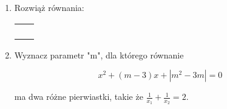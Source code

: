 \documentclass[12pt,a4paper]{article}
\begin{document}
	\begin{enumerate}[1.]
		
		\item Rozwiąż równania: %
		
		\begin{enumerate}[a)] \begin{tabular}{p{7cm} p{7cm}} 
				\item $||x+3|-4|=5$ & \vspace{0.4cm} 	\item$||x-1|-1|=|x-2|$ \\
				\item $\sqrt{x^2+4x+3}<\frac{25}{3}-\sqrt{x^2-6x+9}$ & \item $2x^2+x|2x-1|\leq3$ \\
				\item $(x-1)^2+|x-1|>6$ & \item $|x^2-3x|+x=2$ \\
				\item $x|x|+|2x-3|=4$ & \item $|x^2-|x|-2|>2$ \\
		\end{tabular} \end{enumerate}
		
		\item Wyznacz parametr "m", dla którego równanie 
		
		$$x^2+(m-3)x+|m^2-3m|=0$$
		
		ma dwa różne pierwiastki, takie że $\frac{1}{x_1}+\frac{1}{x_2}=2$.
		
	\end{enumerate}
	
	
	
\end{document}
